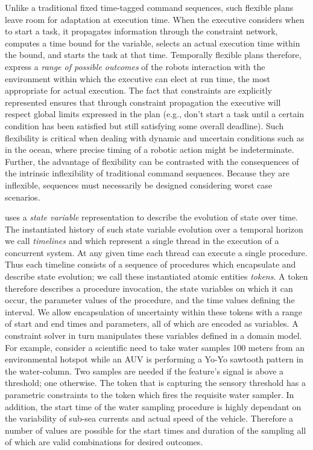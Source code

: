 Unlike a traditional fixed time-tagged command sequences, such
flexible plans leave room for adaptation at execution time. When the
executive considers when to start a task, it propagates information
through the constraint network, computes a time bound for the
variable, selects an actual execution time within the bound, and
starts the task at that time. Temporally flexible plans therefore,
express a \textit{range of possible outcomes} of the robots
interaction with the environment within which the executive can elect
at run time, the most appropriate for actual execution. The fact that
constraints are explicitly represented ensures that through constraint
propagation the executive will respect global limits expressed in the
plan (e.g., don't start a task until a certain condition has been
satisfied but still satisfying some overall deadline). Such
flexibility is critical when dealing with dynamic and uncertain
conditions such as in the ocean, where precise timing of a robotic
action might be indeterminate. Further, the advantage of flexibility
can be contrasted with the consequences of the intrinsic inflexibility
of traditional command sequences. Because they are inflexible,
sequences must necessarily be designed considering worst case
scenarios.

\eu uses a \emph{state variable} representation
\cite{mus94,jonsson00,mcgann09} to describe the evolution of state
over time. The instantiated history of such state variable evolution
over a temporal horizon we call \emph{timelines} and which represent a
single thread in the execution of a concurrent system. At any given
time each thread can execute a single procedure.  Thus each timeline
consists of a sequence of procedures which encapsulate and describe
state evolution; we call these instantiated atomic entities
\emph{tokens}.  A token therefore describes a procedure invocation,
the state variables on which it can occur, the parameter values of the
procedure, and the time values defining the interval. We allow
encapsulation of uncertainty within these tokens with a range of start
and end times and parameters, all of which are encoded as variables. A
constraint solver in turn manipulates these variables defined in a \eu
domain model. For example, consider a scientific need to take water
samples 100 meters from an environmental hotspot while an AUV is
performing a Yo-Yo sawtooth pattern in the water-column. Two samples
are needed if the feature's signal is above a threshold; one
otherwise. The token that is capturing the sensory threshold has a
parametric constraints to the token which fires the requisite water
sampler. In addition, the start time of the water sampling procedure
is highly dependant on the variability of sub-sea currents and actual
speed of the vehicle. Therefore a number of values are possible for
the start times and duration of the sampling all of which are valid
combinations for desired outcomes.

